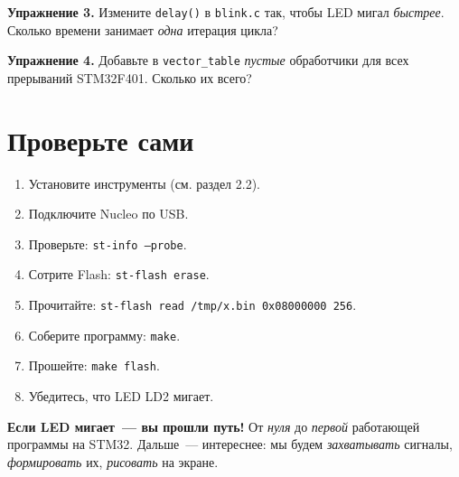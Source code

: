 \begin{exercisebox}
\textbf{Упражнение 3.} Измените \texttt{delay()} в
\texttt{blink.c} так, чтобы LED мигал \emph{быстрее}.
Сколько времени занимает \emph{одна} итерация цикла?
\end{exercisebox}

\begin{exercisebox}
\textbf{Упражнение 4.} Добавьте в \texttt{vector\_table}
\emph{пустые} обработчики для всех прерываний STM32F401.
Сколько их всего?
\end{exercisebox}

\section{Проверьте сами}
\label{sec:flashing-check}

\begin{enumerate}
    \item Установите инструменты (см. раздел 2.2).
    \item Подключите Nucleo по USB.
    \item Проверьте: \texttt{st-info --probe}.
    \item Сотрите Flash: \texttt{st-flash erase}.
    \item Прочитайте: \texttt{st-flash read /tmp/x.bin 0x08000000 256}.
    \item Соберите программу: \texttt{make}.
    \item Прошейте: \texttt{make flash}.
    \item Убедитесь, что LED LD2 мигает.
\end{enumerate}

\begin{ideabox}
\textbf{Если LED мигает~--- вы прошли путь!} От \emph{нуля}
до \emph{первой} работающей программы на STM32. Дальше~---
интереснее: мы будем \emph{захватывать} сигналы, \emph{формировать}
их, \emph{рисовать} на экране.
\end{ideabox}
